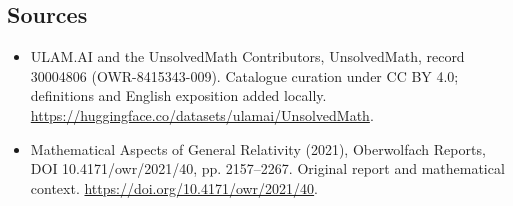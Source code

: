 \documentclass[11pt]{article}
\begin{document}
\subsection{Sources}
\begin{itemize}
\item[\hypertarget{source:30004806:1}{S1}] ULAM.AI and the UnsolvedMath Contributors, UnsolvedMath, record 30004806 (OWR-8415343-009). Catalogue curation under CC BY 4.0; definitions and English exposition added locally.
\url{https://huggingface.co/datasets/ulamai/UnsolvedMath}.
\item[\hypertarget{source:30004806:2}{S2}] Mathematical Aspects of General Relativity (2021), Oberwolfach Reports, DOI 10.4171/owr/2021/40, pp. 2157--2267. Original report and mathematical context.
\url{https://doi.org/10.4171/owr/2021/40}.
\end{itemize}
\label{end:30004806}
\end{document}
